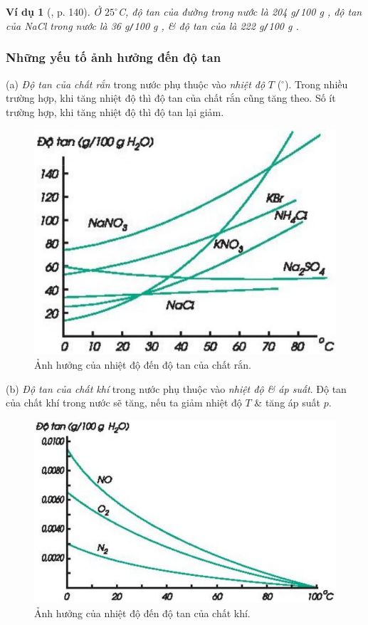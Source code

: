 \documentclass{article}
\newtheorem{vidu}{Ví dụ}
\begin{document}
\begin{vidu}[\cite{SGK_Hoa_Hoc_8}, p. 140]
	Ở $25^\circ$\emph{C}, độ tan của đường trong nước là \emph{204 g\texttt{/}100 g }, độ tan của \emph{NaCl} trong nước là \emph{36 g\texttt{/}100 g }, \& độ tan của \emph{} là \emph{222 g\texttt{/}100 g }.
\end{vidu}

\subsubsection{Những yếu tố ảnh hưởng đến độ tan}
(a) \textit{Độ tan của chất rắn} trong nước phụ thuộc vào \textit{nhiệt độ} $T$ (${}^\circ$). Trong nhiều trường hợp, khi tăng nhiệt độ thì độ tan của chất rắn cũng tăng theo. Số ít trường hợp, khi tăng nhiệt độ thì độ tan lại giảm.
\begin{figure}[H]
	\centering
	\includegraphics[scale=0.3]{nhiet_do_do_tan_chat_ran}
	\caption{Ảnh hưởng của nhiệt độ đến độ tan của chất rắn.}
\end{figure}
\noindent(b) \textit{Độ tan của chất khí} trong nước phụ thuộc vào \textit{nhiệt độ \& áp suất}. Độ tan của chất khí trong nước sẽ tăng, nếu ta giảm nhiệt độ $T$ \& tăng áp suất $p$.
\begin{figure}[H]
	\centering
	\includegraphics[scale=0.3]{nhiet_do_do_tan_chat_khi}
	\caption{Ảnh hưởng của nhiệt độ đến độ tan của chất khí.}
\end{figure}
\end{document}
